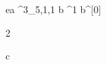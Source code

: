 \begin{eqcode}{e}{a }{^3_{5,1,1}}{}
  b \in {}^1 \lend
  b^{[0]} \gets \begin{tmatrix} 2  \lend \end{tmatrix} \lend
  c \gets {} \lend 
   \lend 
\end{eqcode}
